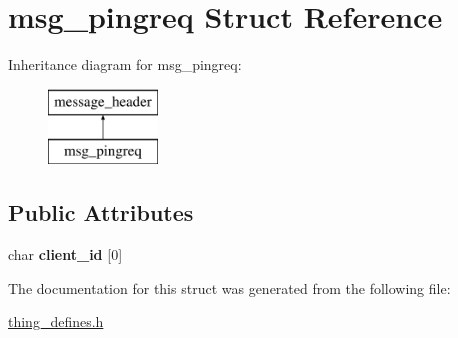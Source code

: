 \hypertarget{structmsg__pingreq}{\section{msg\-\_\-pingreq Struct Reference}
\label{structmsg__pingreq}
}
Inheritance diagram for msg\-\_\-pingreq\-:\begin{figure}[H]
\begin{center}
\leavevmode
\includegraphics[height=2.000000cm]{structmsg__pingreq}
\end{center}
\end{figure}
\subsection*{Public Attributes}
\begin{DoxyCompactItemize}
\item 
\hypertarget{structmsg__pingreq_a0c9e844a39e481ebf6e061bbca5f326f}{char {\bfseries client\-\_\-id} \mbox{[}0\mbox{]}}\label{structmsg__pingreq_a0c9e844a39e481ebf6e061bbca5f326f}

\end{DoxyCompactItemize}


The documentation for this struct was generated from the following file\-:\begin{DoxyCompactItemize}
\item 
\hyperlink{thing__defines_8h}{thing\-\_\-defines.\-h}\end{DoxyCompactItemize}
